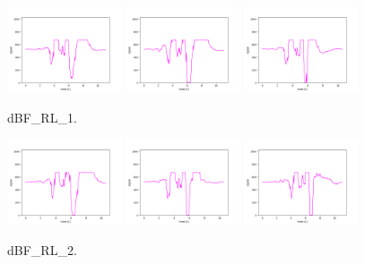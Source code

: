 \begin{figure}[!ht]
\begin{center}
\includegraphics[width=0.3\textwidth]{../data/dBF_RL_1/dBF_RL_1_1.png}
\includegraphics[width=0.3\textwidth]{../data/dBF_RL_1/dBF_RL_1_2.png}
\includegraphics[width=0.3\textwidth]{../data/dBF_RL_1/dBF_RL_1_3.png}
\caption{dBF\_RL\_1.\label{fig:dBF_RL_1}}
\end{center}
\end{figure}

\begin{figure}[!ht]
\begin{center}
\includegraphics[width=0.3\textwidth]{../data/dBF_RL_2/dBF_RL_2_1.png}
\includegraphics[width=0.3\textwidth]{../data/dBF_RL_2/dBF_RL_2_2.png}
\includegraphics[width=0.3\textwidth]{../data/dBF_RL_2/dBF_RL_2_3.png}
\caption{dBF\_RL\_2.\label{fig:dBF_RL_2}}
\end{center}
\end{figure}

